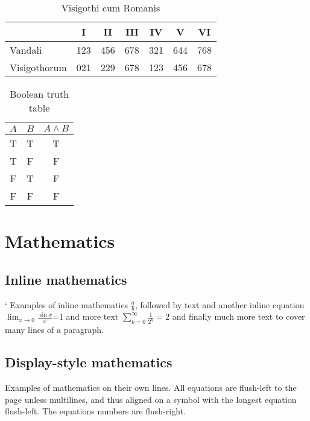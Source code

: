 \documentclass[10pt, letterpaper, twoside]{article}
\theoremstyle{myenv}
\theoremstyle{mytheorem}
\theoremstyle{mydefinition}
\begin{document}
\begin{table}[H]
\begin{flushleft}
\begin{tabular}{lcccccc}
\toprule
& I &  II & III & IV & V & VI \\
\midrule
Vandali     & 123 & 456 & 678 & 321 & 644 & 768  \\
Visigothorum & 021 & 229 & 678 & 123 & 456 & 678 \\
\bottomrule
\end{tabular}
\label{tab:visigothi_cum_romanis}
\caption{Visigothi cum Romanis}
\end{flushleft}
\end{table}

\begin{table}[H]
\begin{flushleft}
\begin{tabular}{ccc}
\toprule
$A$ & $B$ & $ A \land B$ \\
\midrule
T & T & T \\
T & F & F \\
F & T & F \\
F & F & F \\
\bottomrule
\end{tabular}
\label{tab:boolean_truth_table}
\caption{Boolean truth table}
\end{flushleft}
\end{table}

\newpage
\section{Mathematics}
\label{sec:mathematics}

\subsection{Inline mathematics}
\label{sec:inline_mathematics}`
Examples of inline mathematics $\frac{a}{b}$, followed by text and another inline equation $\lim_{x\to 0}\frac{\sin x}{x}$=1 and more text $\sum_{k=0}^\infty \frac{1}{2^k}=2$ and finally much more text to cover many lines of a paragraph.

\subsection{Display-style mathematics}
\label{sec:display_style_mathematics}
Examples of mathematics on their own lines. All equations are flush-left to the page unless multilines, and thus aligned on a symbol with the longest equation flush-left. The equations numbers are flush-right.
\end{document}
